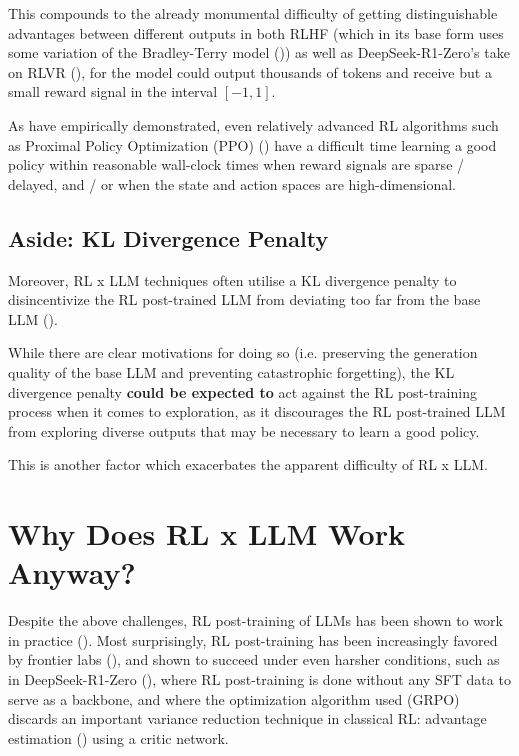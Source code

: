 \documentclass{article} %
\theoremstyle{definition}
\begin{document}
This compounds to the already monumental difficulty of getting 
distinguishable advantages between different outputs
in both RLHF (which in its base form uses some variation of the Bradley-Terry model (\cite{Bradley-and-Terry-1952}))
as well as DeepSeek-R1-Zero's take on RLVR (\cite{DeepSeek-2025}), 
for the model could output thousands of tokens and receive but a small reward signal
in the interval $[-1, 1]$. 

As \cite{Salimans-and-Chen-2018} have empirically demonstrated,
even relatively advanced RL algorithms such as Proximal Policy Optimization (PPO) 
(\cite{Schulman-et-al-2017}) have a difficult time learning a good policy
within reasonable wall-clock times
when reward signals are sparse / delayed, and / or when 
the state and action spaces are high-dimensional.

\subsection{Aside: KL Divergence Penalty}
Moreover, RL x LLM techniques often utilise a KL divergence penalty
to disincentivize the RL post-trained LLM from deviating too far from the base LLM
(\cite{InstructGPT-2022, Lambert-et-al-2024, DeepSeek-2025}).

While there are clear motivations for doing so (i.e.
preserving the generation quality of the base LLM and preventing catastrophic forgetting),
the KL divergence penalty \textbf{could be expected to} act against the RL post-training process
when it comes to exploration, as it discourages the RL post-trained LLM
from exploring diverse outputs that may be necessary to learn a good policy.

This is another factor which exacerbates the apparent difficulty of RL x LLM.

\section{Why Does RL x LLM Work Anyway?}

Despite the above challenges, RL post-training of LLMs has been shown to work
in practice (\cite{InstructGPT-2022}). Most surprisingly,
RL post-training has been increasingly favored by frontier labs
(\cite{Anthropic-2025, Lambert-et-al-2024}), and shown to succeed
under even harsher conditions, such as in DeepSeek-R1-Zero (\cite{DeepSeek-2025}),
where RL post-training is done without any SFT data to serve as a backbone,
and where the optimization algorithm used (GRPO) discards an important
variance reduction technique in classical RL: advantage 
estimation (\cite{Schulman-et-al-2017, Sutton-and-Barto-1998}) using a critic network.
\end{document}
